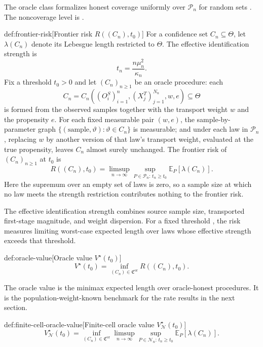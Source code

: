 The oracle class  formalizes honest coverage uniformly over \(\mathcal P_n\) for random sets . The noncoverage level is .

\begin{definitionv}{def:frontier-risk}[Frontier risk $R((C_n),t_0)$]
For a confidence set \(C_n\subseteq\Theta\), let \(\lambda(C_n)\) denote its Lebesgue length restricted to \(\Theta\). The effective identification strength is
\[
t_n=\frac{n\mu_n^2}{\kappa_n}.
\]
Fix a threshold \(t_0>0\) and let \((C_n)_{n\ge 1}\) be an oracle procedure: each
\[
C_n=C_n\!\left((O_i^S)_{i=1}^n,(X_j^T)_{j=1}^{N_n},w,e\right)\subseteq\Theta
\]
is formed from the observed samples together with the transport weight \(w\) and the propensity \(e\). For each fixed measurable pair \((w,e)\), the sample-by-parameter graph \(\{(\text{sample},\vartheta):\vartheta\in C_n\}\) is measurable; and under each law in \(\mathcal P_n\), replacing \(w\) by another version of that law's transport weight, evaluated at the true propensity, leaves \(C_n\) almost surely unchanged. The frontier risk of \((C_n)_{n\ge1}\) at \(t_0\) is
\[
R((C_n),t_0)
=
\limsup_{n\to\infty}
\sup_{P\in\mathcal P_n:\,t_n\ge t_0}
\mathbb E_P[\lambda(C_n)].
\]
Here the supremum over an empty set of laws is zero, so a sample size at which no law meets the strength restriction contributes nothing to the frontier risk.
\end{definitionv}

The effective identification strength  combines source sample size, transported first-stage magnitude, and weight dispersion. For a fixed threshold , the risk  measures limiting worst-case expected length over laws whose effective strength exceeds that threshold.

\begin{definitionv}{def:oracle-value}[Oracle value $V^\star(t_0)$]
\[
V^\star(t_0)
=
\inf_{(C_n)\in\mathfrak C^{\mathrm{or}}}
R((C_n),t_0).
\]
\end{definitionv}

The oracle value  is the minimax expected length over oracle-honest procedures. It is the population-weight-known benchmark for the rate results in the next section.

\begin{definitionv}{def:finite-cell-oracle-value}[Finite-cell oracle value $V_{\mathcal N}^\star(t_0)$]
\[
V_{\mathcal N}^\star(t_0)
=
\inf_{(C_n)\in\mathfrak C^{\mathrm{or}}}
\limsup_{n\to\infty}
\sup_{P\in\mathcal N_n:\,t_n\ge t_0}
\mathbb E_P[\lambda(C_n)].
\]
\end{definitionv}

